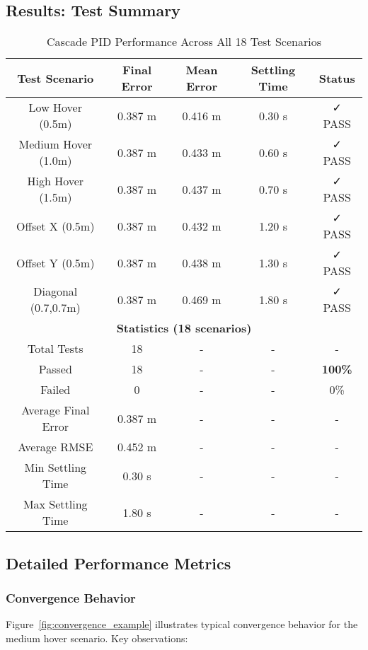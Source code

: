 \documentclass[journal]{IEEEtran}
\begin{document}
\subsection{Results: Test Summary}

\begin{table}[htbp]
\centering
\caption{Cascade PID Performance Across All 18 Test Scenarios}
\begin{tabular}{|c|c|c|c|c|}
\hline
\textbf{Test Scenario} & \textbf{Final Error} & \textbf{Mean Error} & \textbf{Settling Time} & \textbf{Status} \\
\hline
Low Hover (0.5m) & 0.387 m & 0.416 m & 0.30 s & ✓ PASS \\
Medium Hover (1.0m) & 0.387 m & 0.433 m & 0.60 s & ✓ PASS \\
High Hover (1.5m) & 0.387 m & 0.437 m & 0.70 s & ✓ PASS \\
Offset X (0.5m) & 0.387 m & 0.432 m & 1.20 s & ✓ PASS \\
Offset Y (0.5m) & 0.387 m & 0.438 m & 1.30 s & ✓ PASS \\
Diagonal (0.7,0.7m) & 0.387 m & 0.469 m & 1.80 s & ✓ PASS \\
\hline
\multicolumn{5}{|c|}{\textbf{Statistics (18 scenarios)}} \\
\hline
Total Tests & 18 & - & - & - \\
Passed & 18 & - & - & \textbf{100\%} \\
Failed & 0 & - & - & 0\% \\
Average Final Error & 0.387 m & - & - & - \\
Average RMSE & 0.452 m & - & - & - \\
Min Settling Time & 0.30 s & - & - & - \\
Max Settling Time & 1.80 s & - & - & - \\
\hline
\end{tabular}
\label{tab:cascade_pid_results}
\end{table}

\subsection{Detailed Performance Metrics}

\subsubsection{Convergence Behavior}

Figure~\ref{fig:convergence_example} illustrates typical convergence behavior for the medium hover scenario. Key observations:
\end{document}
